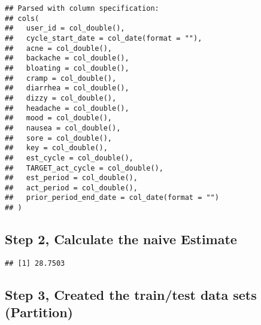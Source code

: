\documentclass[]{article}
\newenvironment{Shaded}{\begin{snugshade}}{\end{snugshade}}
\newcommand{\KeywordTok}[1]{\textcolor[rgb]{0.13,0.29,0.53}{\textbf{#1}}}
\newcommand{\DecValTok}[1]{\textcolor[rgb]{0.00,0.00,0.81}{#1}}
\newcommand{\FloatTok}[1]{\textcolor[rgb]{0.00,0.00,0.81}{#1}}
\newcommand{\StringTok}[1]{\textcolor[rgb]{0.31,0.60,0.02}{#1}}
\newcommand{\CommentTok}[1]{\textcolor[rgb]{0.56,0.35,0.01}{\textit{#1}}}
\newcommand{\OperatorTok}[1]{\textcolor[rgb]{0.81,0.36,0.00}{\textbf{#1}}}
\newcommand{\NormalTok}[1]{#1}
\begin{document}
\begin{verbatim}
## Parsed with column specification:
## cols(
##   user_id = col_double(),
##   cycle_start_date = col_date(format = ""),
##   acne = col_double(),
##   backache = col_double(),
##   bloating = col_double(),
##   cramp = col_double(),
##   diarrhea = col_double(),
##   dizzy = col_double(),
##   headache = col_double(),
##   mood = col_double(),
##   nausea = col_double(),
##   sore = col_double(),
##   key = col_double(),
##   est_cycle = col_double(),
##   TARGET_act_cycle = col_double(),
##   est_period = col_double(),
##   act_period = col_double(),
##   prior_period_end_date = col_date(format = "")
## )
\end{verbatim}

\subsection{Step 2, Calculate the naive
Estimate}\label{step-2-calculate-the-naive-estimate}

\begin{Shaded}
\end{Shaded}

\begin{verbatim}
## [1] 28.7503
\end{verbatim}

\subsection{Step 3, Created the train/test data sets
(Partition)}\label{step-3-created-the-traintest-data-sets-partition}

\begin{Shaded}
\end{Shaded}
\end{document}
